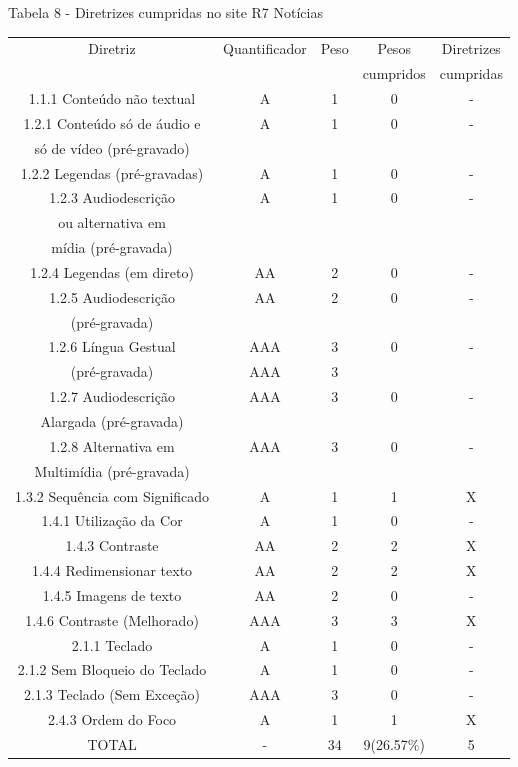 \documentclass[a4paper]{article}
\begin{document}
\begin{titlepage}
Tabela 8 - Diretrizes cumpridas no site R7 Notícias\\[-1cm]
\begin{center}
	\fontsize{8pt}{8pt}\selectfont	
	\begin{longtable}{|c|c|c|c|c|}
		\hline
		Diretriz & Quantificador & Peso & Pesos & Diretrizes\\
		& & & cumpridos & cumpridas\\
		\hline
		1.1.1 Conteúdo não textual & A & 1 & 0 & - \\
		\hline
		1.2.1 Conteúdo só de áudio e & A & 1 & 0 & - \\
		só de vídeo (pré-gravado) & & & & \\
		\hline
		1.2.2 Legendas (pré-gravadas) & A & 1 & 0 & - \\
		\hline
		1.2.3 Audiodescrição & A & 1 & 0 & - \\
		ou alternativa em & & & & \\
		mídia (pré-gravada) & & & & \\
		\hline
		1.2.4 Legendas (em direto) & AA & 2 & 0 & - \\
		\hline
		1.2.5 Audiodescrição & AA & 2 & 0 & - \\
		(pré-gravada) & & & & \\
		\hline
		1.2.6 Língua Gestual & AAA & 3 & 0 & - \\
		(pré-gravada) & AAA & 3 & & \\
		\hline
		1.2.7 Audiodescrição & AAA & 3 & 0 & - \\
		Alargada (pré-gravada) & & & & \\
		\hline
		1.2.8 Alternativa em & AAA & 3 & 0 & - \\
		Multimídia (pré-gravada) & & & & \\
		\hline
		1.3.2 Sequência com Significado & A & 1 & 1 & X \\
		\hline
		1.4.1 Utilização da Cor & A & 1 & 0 & - \\
		\hline
		1.4.3 Contraste & AA & 2 & 2 & X \\
		\hline
		1.4.4 Redimensionar texto & AA & 2 & 2 & X \\
		\hline
		1.4.5 Imagens de texto & AA & 2 & 0 & - \\
		\hline
		1.4.6 Contraste (Melhorado) & AAA & 3 & 3 & X \\
		\hline
		2.1.1 Teclado & A & 1 & 0 & - \\
		\hline
		2.1.2 Sem Bloqueio do Teclado & A & 1 & 0 & - \\
		\hline
		2.1.3 Teclado (Sem Exceção) & AAA & 3 & 0 & - \\
		\hline
		2.4.3 Ordem do Foco & A & 1 & 1 & X \\
		\hline
		TOTAL & - & 34 & 9(26.57\%) & 5 \\
		\hline
	\end{longtable}
\end{center}


\end{titlepage}
\end{document}
